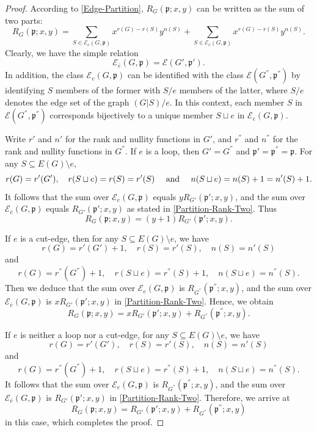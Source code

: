 \documentclass[10pt,a4paper]{amsart}
\def\And{\mbox{\rm ~and~}}
\begin{document}
\begin{proof}
According to \eqref{Edge-Partition},  $R_G(\mathfrak{p};x,y)$ can be written as the sum of two parts:
\begin{equation}\label{Partition-Rank-Two}
R_G(\mathfrak{p};x,y)=\sum_{S\in \mathcal{E}_e(G,\mathfrak{p})}x^{r(G)-r(S)}y^{n(S)}+\sum_{S\in \mathcal{E}_{\bar{e}}(G,\mathfrak{p})}x^{r(G)-r(S)}y^{n(S)}.
\end{equation}
Clearly, we have the simple relation
\begin{equation*}\label{Partition-e}
\mathcal{E}_{\bar{e}}(G,\mathfrak{p})=\mathcal{E}(G',\mathfrak{p}').
\end{equation*}
In addition, the class $\mathcal{E}_e(G,\mathfrak{p})$ can be identified with the class $\mathcal{E}(G^{''},\mathfrak{p}^{''})$ by identifying $S$ members of the former with $S/e$ members of the latter, where $S/e$ denotes the edge set of the graph $(G|S)/e$. In this context, each member $S$ in $\mathcal{E}(G^{''},\mathfrak{p}^{''})$ corresponds bijectively to a unique member $S\sqcup e$ in $\mathcal{E}_e(G,\mathfrak{p})$.

Write $r'$ and $n'$ for the rank and nullity functions in $G'$, and $r^{''}$ and $n^{''}$ for the rank and nullity functions in $G^{''}$. If $e$ is a loop, then $G'=G^{''}$ and $\mathfrak{p}'=\mathfrak{p}^{''}=\mathfrak{p}$. For any $S\subseteq E(G)\setminus e$, 
\begin{equation*}\label{Rank-Nullity-Relation1}
r(G)=r'(G'),\quad r(S\sqcup e)=r(S)=r'(S)\quad\And\quad n(S\sqcup e)=n(S)+1=n'(S)+1.
\end{equation*}
It follows that the sum over $\mathcal{E}_e(G,\mathfrak{p})$ equals $yR_{G'}(\mathfrak{p}';x,y)$, and the sum over $\mathcal{E}_{\bar{e}}(G,\mathfrak{p})$ equals $R_{G'}(\mathfrak{p}';x,y)$ as stated in \eqref{Partition-Rank-Two}. Thus
\[
R_G(\mathfrak{p};x,y)=(y+1)R_{G'}(\mathfrak{p}';x,y).
\]

If $e$ is a cut-edge, then  for any $S\subseteq E(G)\setminus e$, we have
\[
r(G)=r'(G')+1,\quad r(S)=r'(S),\quad n(S)=n'(S)
\]
and
\[
r(G)=r^{''}(G^{''})+1,\quad r(S\sqcup e)=r^{''}(S)+1,\quad n(S\sqcup e)=n^{''}(S).
\]
Then we deduce that the sum over $\mathcal{E}_e(G,\mathfrak{p})$ is $R_{G^{''}}(\mathfrak{p}^{''};x,y)$, and the sum over $\mathcal{E}_{\bar{e}}(G,\mathfrak{p})$ is $xR_{G'}(\mathfrak{p}';x,y)$ in \eqref{Partition-Rank-Two}. Hence, we obtain
\[
R_G(\mathfrak{p};x,y)=xR_{G'}(\mathfrak{p}';x,y)+R_{G^{''}}(\mathfrak{p}^{''};x,y).
\]

If $e$ is neither a loop nor a cut-edge, for any $S\subseteq E(G)\setminus e$, we have
\[
r(G)=r'(G'),\quad r(S)=r'(S),\quad n(S)=n'(S)
\]
and
\[
r(G)=r^{''}(G^{''})+1,\quad r(S\sqcup e)=r^{''}(S)+1,\quad n(S\sqcup e)=n^{''}(S).
\]
It follows that the sum over $\mathcal{E}_e(G,\mathfrak{p})$ is $R_{G^{''}}(\mathfrak{p}^{''};x,y)$, and the sum over $\mathcal{E}_{\bar{e}}(G,\mathfrak{p})$ is $R_{G'}(\mathfrak{p}';x,y)$ in \eqref{Partition-Rank-Two}. Therefore, we arrive at
\[
R_G(\mathfrak{p};x,y)=R_{G'}(\mathfrak{p}';x,y)+R_{G^{''}}(\mathfrak{p}^{''};x,y)
\]
in this case, which completes the proof.
\end{proof}
\end{document}
